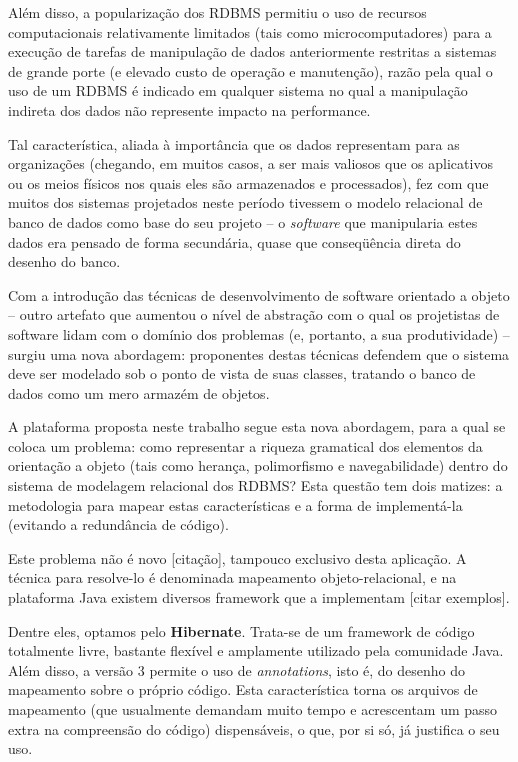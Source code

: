 \documentclass[12pt,twoside]{article}
\begin{document}
Al\'em disso, a populariza\c{c}\~ao dos RDBMS permitiu o uso de recursos
computacionais relativamente limitados (tais como microcomputadores)
para a execu\c{c}\~ao de tarefas de manipula\c{c}\~ao de dados
anteriormente restritas a sistemas de grande porte (e elevado custo de
opera\c{c}\~ao e manuten\c{c}\~ao), raz\~ao pela qual o uso de um RDBMS
\'e indicado em qualquer sistema no qual a manipula\c{c}\~ao indireta
dos dados n\~ao represente impacto na performance.

Tal caracter\'istica, aliada \`a import\^ancia que os dados representam
para as organiza\c{c}\~oes (chegando, em muitos casos, a ser mais
valiosos que os aplicativos ou os meios f\'isicos nos quais eles s\~ao
armazenados e processados), fez com que muitos dos sistemas projetados
neste per\'iodo tivessem o modelo relacional de banco de dados como
base do seu projeto {--} o \textit{software}\textup{ que manipularia
estes dados era pensado de forma secund\'aria, quase que
conseq\"u\^encia direta do desenho do banco.}

Com a introdu\c{c}\~ao das t\'ecnicas de desenvolvimento de software
orientado a objeto {--} outro artefato que aumentou o n\'ivel de
abstra\c{c}\~ao com o qual os projetistas de software lidam com o
dom\'inio dos problemas (e, portanto, a sua produtividade) {--} surgiu
uma nova abordagem: proponentes destas t\'ecnicas defendem que o
sistema deve ser modelado sob o ponto de vista de suas classes,
tratando o banco de dados como um mero armaz\'em de objetos.

A plataforma proposta neste trabalho segue esta nova abordagem, para a
qual se coloca um problema: como representar a riqueza gramatical dos
elementos da orienta\c{c}\~ao a objeto (tais como heran\c{c}a,
polimorfismo e navegabilidade) dentro do sistema de modelagem
relacional dos RDBMS? Esta quest\~ao tem dois matizes: a metodologia
para mapear estas caracter\'isticas e a forma de implement\'a{}-la
(evitando a redund\^ancia de c\'odigo).

Este problema n\~ao \'e novo [cita\c{c}\~ao], tampouco exclusivo desta
aplica\c{c}\~ao. A t\'ecnica para resolve{}-lo \'e denominada
mapeamento objeto{}-relacional, e na plataforma Java existem diversos
\textup{framework} que a implementam [citar exemplos].

Dentre eles, optamos pelo \textbf{Hibernate}. Trata{}-se de um framework
de c\'odigo totalmente livre, bastante flex\'ivel e amplamente
utilizado pela comunidade Java. Al\'em disso, a vers\~ao 3 permite o
uso de \textit{annotations}\textup{, isto \'e, do desenho do mapeamento
sobre o pr\'oprio c\'odigo. Esta caracter\'istica torna os arquivos de
mapeamento (que usualmente demandam muito tempo e acrescentam um passo
extra na compreens\~ao do c\'odigo) dispens\'aveis, o que, por si s\'o,
j\'a justifica o seu uso.}
\end{document}
